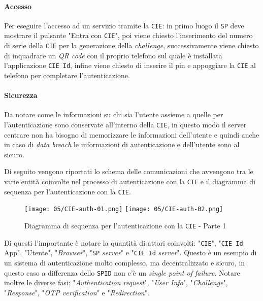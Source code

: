             \paragraph{Accesso} Per eseguire l'accesso ad un servizio tramite la \texttt{CIE}: in primo luogo il \texttt{SP} deve mostrare il pulsante "Entra con \texttt{CIE}", poi viene chiesto l'inserimento del numero di serie della \texttt{CIE} per la generazione della \textit{challenge}, successivamente viene chiesto di inquadrare un \textit{QR code} con il proprio telefono sul quale è installata l'applicazione \texttt{CIE Id}, infine viene chiesto di inserire il pin e appoggiare la \texttt{CIE} al telefono per completare l'autenticazione.
            
        \paragraph{Sicurezza} Da notare come le informazioni su chi sia l'utente assieme a quelle per l'autenticazione sono conservate all'interno della \texttt{CIE}, in questo modo il server centrare non ha bisogno di memorizzare le informazioni dell'utente e quindi anche in caso di \textit{data breach} le informazioni di autenticazione e dell'utente sono al sicuro.

        Di seguito vengono riportati lo schema delle comunicazioni che avvengono tra le varie entità coinvolte nel processo di autenticazione con la \texttt{CIE} e il diagramma di sequenza per l'autenticazione con la \texttt{CIE}.
        
        \begin{figure}[H]
            \centering
            \texttt{[image: 05/CIE-auth-01.png]}
            \texttt{[image: 05/CIE-auth-02.png]}
            \caption{Diagramma di sequenza per l'autenticazione con la \texttt{CIE} - Parte 1}
        \end{figure}

        Di questi l'importante è notare la quantità di attori coinvolti: "\texttt{CIE}", "\texttt{CIE Id} App", "Utente", "\textit{Browser}", "\texttt{SP} \textit{server}" e "\texttt{CIE Id} \textit{server}". Questo è un esempio di un sistema di autenticazione molto complesso, ma decentralizzato e sicuro, in questo caso a differenza dello \texttt{SPID} non c'è un \textit{single point of failure}. Notare inoltre le diverse fasi: "\textit{Authentication request}", "\textit{User Info}", "\textit{Challenge}", "\textit{Response}", "\textit{OTP verification}" e "\textit{Redirection}".
